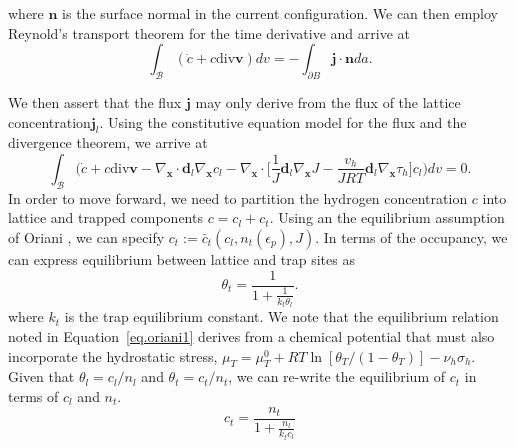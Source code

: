 \documentclass[10pt]{elsarticle}
\newcommand{\mbs}[1]{\boldsymbol{#1}}
\def\bs{{\mbs{s}}} \def\bt{{\mbs{t}}} \def\bu{{\mbs{u}}}
\def\bs{\boldsymbol}
\begin{document}
where $\bs{n}$ is the surface normal in the current configuration. We can then employ Reynold's transport theorem for the time derivative and arrive at 
%
\begin{equation}
\label{eq.hconservation2}  \int_{\mathcal{B}} (\dot{c} + c\text{div}\bs{v}) dv = -\int_{\partial B} \bs{j} \cdot \bs{n} da.
\end{equation}   
%

We then assert that the flux $\bs{j}$ may only derive from the flux of the lattice concentration$\bs{j}_{l}$. Using the constitutive equation model for the flux and the divergence theorem, we arrive at 
%
\begin{equation}
\label{eq.hconservation3}  \int_{\mathcal{B}} \bigg( \dot{c} + c\text{div}\bs{v} - \nabla_{\bs{x}} \cdot \bs{d}_{l} \nabla_{\bs{x}}c_{l}   -  \nabla_{\bs{x}} \cdot \bigg[ \frac{1}{J} \bs{d}_{l} \nabla_{\bs{x}}J -  \frac{v_{h}}{JR T} \bs{d}_{l} \nabla_{\bs{x}}\tau_{h}\bigg] c_{l} \bigg) dv = 0.
\end{equation}
%
In order to move forward, we need to partition the hydrogen concentration $c$ into lattice and trapped components $c = c_{l} + c_{t}$. Using an the equilibrium assumption of Oriani \cite{Oriani1970}, we can specify $c_{t} := \bar{c}_{t}(c_{l}, n_t(\epsilon_{p}), J)$. In terms of the occupancy, we can express equilibrium between lattice and trap sites as
%
\begin{equation}
\label{eq.oriani1} \theta_{t} = \frac{1}{1 + \frac{1}{k_{t} \theta_{l}}}.
\end{equation}
where $k_t$ is the trap equilibrium constant.  We note that the equilibrium relation noted in Equation~\ref{eq.oriani1} derives from a chemical potential that must also incorporate the hydrostatic stress, $\mu_{T} =  \mu_{T}^{0} + RT\ln[\theta_{T}/(1-\theta_{T})] - \nu_{h}\sigma_{h} $. Given that $\theta_{l} = c_{l}/n_{l}$ and $\theta_{t} = c_{t}/n_{t}$, we can re-write the equilibrium of $c_{t}$ in terms of $c_{l}$ and $n_{t}$. 
%
\begin{equation}
\label{eq.oriani2} c_{t} = \frac{n_{t}}{1 + \frac{n_{l}}{k_{t} c_{l}}}
\end{equation}
\end{document}
